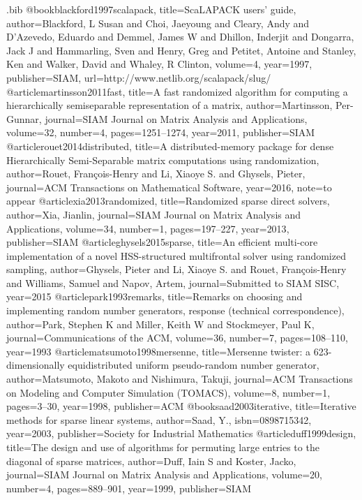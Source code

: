 \documentclass{article}
\begin{document}
\begin{filecontents}{\jobname.bib}
@book{blackford1997scalapack,
  title={ScaLAPACK users' guide},
  author={Blackford, L Susan and Choi, Jaeyoung and Cleary, Andy and D'Azevedo, Eduardo and Demmel, James W and Dhillon, Inderjit and Dongarra, Jack J and Hammarling, Sven and Henry, Greg and Petitet, Antoine and Stanley, Ken and Walker, David and Whaley, R Clinton},
  volume={4},
  year={1997},
  publisher={SIAM},
  url={http://www.netlib.org/scalapack/slug/}
}
@article{martinsson2011fast,
  title={A fast randomized algorithm for computing a hierarchically semiseparable representation of a matrix},
  author={Martinsson, Per-Gunnar},
  journal={SIAM Journal on Matrix Analysis and Applications},
  volume={32},
  number={4},
  pages={1251--1274},
  year={2011},
  publisher={SIAM}
}
@article{rouet2014distributed,
  title={A distributed-memory package for dense Hierarchically Semi-Separable matrix computations using randomization},
  author={Rouet, Fran\c{c}ois-Henry and Li, Xiaoye S. and Ghysels, Pieter},
  journal={ACM Transactions on Mathematical Software},
  year={2016},
  note={to appear}
}
@article{xia2013randomized,
  title={Randomized sparse direct solvers},
  author={Xia, Jianlin},
  journal={SIAM Journal on Matrix Analysis and Applications},
  volume={34},
  number={1},
  pages={197--227},
  year={2013},
  publisher={SIAM}
}
@article{ghysels2015sparse,
  title={An efficient multi-core implementation of a novel {HSS}-structured multifrontal solver using randomized sampling},
  author={Ghysels, Pieter and Li, Xiaoye S. and Rouet, Fran\c{c}ois-Henry and Williams, Samuel and Napov, Artem},
  journal={Submitted to SIAM SISC},
  year={2015}
}
@article{park1993remarks,
  title={Remarks on choosing and implementing random number generators, response (technical correspondence)},
  author={Park, Stephen K and Miller, Keith W and Stockmeyer, Paul K},
  journal={Communications of the ACM},
  volume={36},
  number={7},
  pages={108--110},
  year={1993}
}
@article{matsumoto1998mersenne,
  title={Mersenne twister: a 623-dimensionally equidistributed uniform pseudo-random number generator},
  author={Matsumoto, Makoto and Nishimura, Takuji},
  journal={ACM Transactions on Modeling and Computer Simulation (TOMACS)},
  volume={8},
  number={1},
  pages={3--30},
  year={1998},
  publisher={ACM}
}
@book{saad2003iterative,
  title={{Iterative methods for sparse linear systems}},
  author={Saad, Y.},
  isbn={0898715342},
  year={2003},
  publisher={Society for Industrial Mathematics}
}
@article{duff1999design,
  title={The design and use of algorithms for permuting large entries to the diagonal of sparse matrices},
  author={Duff, Iain S and Koster, Jacko},
  journal={SIAM Journal on Matrix Analysis and Applications},
  volume={20},
  number={4},
  pages={889--901},
  year={1999},
  publisher={SIAM}
}


\end{filecontents}
\end{document}
